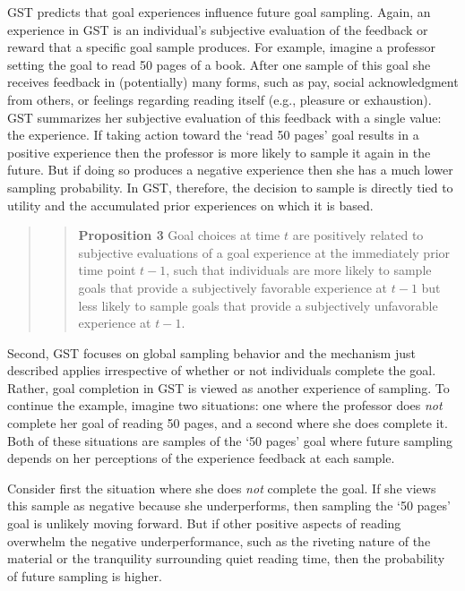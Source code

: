 \documentclass[english,,man]{apa6}
\theoremstyle{definition}
\theoremstyle{definition}
\theoremstyle{definition}
\theoremstyle{remark}
\begin{document}
GST predicts that goal experiences influence future goal sampling.
Again, an experience in GST is an individual's subjective evaluation of
the feedback or reward that a specific goal sample produces. For
example, imagine a professor setting the goal to read 50 pages of a
book. After one sample of this goal she receives feedback in
(potentially) many forms, such as pay, social acknowledgment from
others, or feelings regarding reading itself (e.g., pleasure or
exhaustion). GST summarizes her subjective evaluation of this feedback
with a single value: the experience. If taking action toward the `read
50 pages' goal results in a positive experience then the professor is
more likely to sample it again in the future. But if doing so produces a
negative experience then she has a much lower sampling probability. In
GST, therefore, the decision to sample is directly tied to utility and
the accumulated prior experiences on which it is based.

\begin{quote}
\begin{quote}
\textbf{Proposition 3} Goal choices at time \(t\) are positively related
to subjective evaluations of a goal experience at the immediately prior
time point \(t - 1\), such that individuals are more likely to sample
goals that provide a subjectively favorable experience at \(t - 1\) but
less likely to sample goals that provide a subjectively unfavorable
experience at \(t - 1\).
\end{quote}
\end{quote}

Second, GST focuses on global sampling behavior and the mechanism just
described applies irrespective of whether or not individuals complete
the goal. Rather, goal completion in GST is viewed as another experience
of sampling. To continue the example, imagine two situations: one where
the professor does \emph{not} complete her goal of reading 50 pages, and
a second where she does complete it. Both of these situations are
samples of the `50 pages' goal where future sampling depends on her
perceptions of the experience feedback at each sample.

Consider first the situation where she does \emph{not} complete the
goal. If she views this sample as negative because she underperforms,
then sampling the `50 pages' goal is unlikely moving forward. But if
other positive aspects of reading overwhelm the negative
underperformance, such as the riveting nature of the material or the
tranquility surrounding quiet reading time, then the probability of
future sampling is higher.
\end{document}
